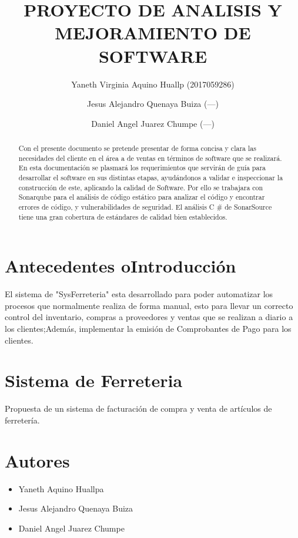 \documentclass[preprint,12pt]{elsarticle}
\begin{document}
	
	\begin{frontmatter}

		\title{\huge  PROYECTO DE  ANALISIS Y  MEJORAMIENTO DE  SOFTWARE }
		\author{Yaneth Virginia Aquino Huallp                (2017059286)}
		\author{Jesus Alejandro Quenaya Buiza              (---)}
		\author{Daniel Angel Juarez Chumpe              (---)}
		\address{Tacna, Perú}
		


\begin{abstract}
Con el presente documento se pretende presentar de forma concisa y clara las necesidades del cliente en el área a de ventas en términos de software que se realizará. 
En esta documentación se plasmará los requerimientos que servirán de guía para desarrollar el software en sus distintas etapas, ayudándonos a validar e inspeccionar la construcción de este, aplicando la calidad de Software.
Por ello se trabajara con  Sonarqube para el análisis de código estático
para analizar el código y encontrar errores de código, y vulnerabilidades de seguridad. 
El análisis C # de SonarSource tiene una gran cobertura de estándares de calidad bien establecidos.  
\end{abstract}


\end{frontmatter}
\section{Antecedentes oIntroducción}

El sistema de "SysFerreteria" esta desarrollado para poder automatizar los procesos que
normalmente realiza de forma manual, esto para llevar un correcto control del
inventario, compras a proveedores y ventas que se realizan a diario a los clientes;Además, implementar la emisión de Comprobantes de Pago para  los clientes.

\section{Sistema de Ferreteria}
Propuesta de un sistema de facturación de  compra y venta
de artículos de ferretería.
\section{Autores}
\begin{itemize}
    \item Yaneth Aquino Huallpa
    \item Jesus Alejandro Quenaya Buiza  
    \item Daniel Angel Juarez Chumpe
\end{itemize}
\end{document}

